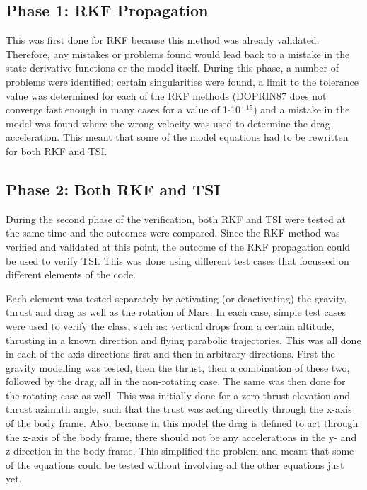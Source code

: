 \subsection{Phase 1: \ac{RKF} Propagation}
\label{subsec:phase1com}
This was first done for \ac{RKF} because this method was already validated. Therefore, any mistakes or problems found would lead back to a mistake in the state derivative functions or the model itself.
During this phase, a number of problems were identified; certain singularities were found, a limit to the tolerance value was determined for each of the \ac{RKF} methods (\ac{DOPRIN87} does not converge fast enough in many cases for a value of 1$\cdot$10$^{-15}$) and a mistake in the model was found where the wrong velocity was used to determine the drag acceleration. This meant that some of the model equations had to be rewritten for both \ac{RKF} and \ac{TSI}. 

\subsection{Phase 2: Both \ac{RKF} and \ac{TSI}}
\label{subsec:phase2com}
During the second phase of the verification, both \ac{RKF} and \ac{TSI} were tested at the same time and the outcomes were compared. Since the \ac{RKF} method was verified and validated at this point, the outcome of the \ac{RKF} propagation could be used to verify \ac{TSI}. This was done using different test cases that focussed on different elements of the code.

Each element was tested separately by activating (or deactivating) the gravity, thrust and drag as well as the rotation of Mars. In each case, simple test cases were used to verify the class, such as: vertical drops from a certain altitude, thrusting in a known direction and flying parabolic trajectories. This was all done in each of the axis directions first and then in arbitrary directions. First the gravity modelling was tested, then the thrust, then a combination of these two, followed by the drag, all in the non-rotating case. The same was then done for the rotating case as well. This was initially done for a zero thrust elevation and thrust azimuth angle, such that the trust was acting directly through the x-axis of the body frame. Also, because in this model the drag is defined to act through the x-axis of the body frame, there should not be any accelerations in the y- and z-direction in the body frame. This simplified the problem and meant that some of the equations could be tested without involving all the other equations just yet.

